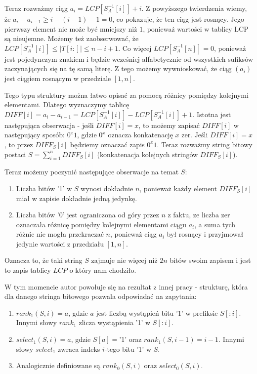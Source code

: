 \documentclass{article}
\begin{document}
Teraz rozważmy ciąg $a_i = LCP[S_A^{-1}[i]] + i$. Z powyższego twierdzenia wiemy, że $a_i - a_{i-1} \ge i - (i-1) - 1 = 0$, co pokazuje, że ten ciąg jest rosnący. Jego pierwszy element nie może być mniejszy niż $1$, ponieważ wartości w tablicy LCP są nieujemne. Możemy też zaobserwować, że $LCP[S_A^{-1}[i]] \le |T[i:]| \le n-i+1$. Co więcej $LCP[S_A^{-1}[n]] = 0$, ponieważ jest pojedynczym znakiem i będzie wcześniej alfabetycznie od wszystkich sufiksów zaczynających się na tę samą literę. Z tego możemy wywnioskować, że ciąg $(a_i)$ jest ciągiem rosnącym w przedziale $[1,n]$.

Tego typu struktury można łatwo opisać za pomocą różnicy pomiędzy kolejnymi elementami. Dlatego wyznaczymy tablicę $DIFF[i] = a_i - a_{i-1} = LCP[S_A^{-1}[i]] - LCP[S_A^{-1}[i]] + 1$. Istotna jest następująca obserwacja - jeśli $DIFF[i] = x$, to możemy zapisać $DIFF[i]$ w następujący sposób: $0^x1$, gdzie $0^x$ oznacza konkatenację $x$ zer. Jeśli $DIFF[i] = x$, to przez $DIFF_S[i]$ będziemy oznaczać zapis $0^x1$. Teraz rozważmy string bitowy postaci $S = \sum_{i=1}^n DIFF_S[i]$ (konkatenacja kolejnych stringów $DIFF_S[i]$).

Teraz możemy poczynić następujące obserwacje na temat $S$:
\begin{enumerate}
    \item Liczba bitów '1' w $S$ wynosi dokładnie $n$, ponieważ każdy element $DIFF_S[i]$ miał w zapisie dokładnie jedną jedynkę.
    \item Liczba bitów '0' jest ograniczona od góry przez $n$ z faktu, ze liczba zer oznaczała różnicę pomiędzy kolejnymi elementami ciągu $a_i$, a suma tych różnic nie mogła przekraczać $n$, ponieważ ciąg $a_i$ był rosnący i przyjmował jedynie wartości z przedziału $[1,n]$.
\end{enumerate}

Oznacza to, że taki string $S$ zajmuje nie więcej niż $2n$ bitów swoim zapisem i jest to zapis tablicy $LCP$ o który nam chodziło.

W tym momencie autor powołuje się na rezultat z innej pracy - strukturę, która dla danego stringa bitowego pozwala odpowiadać na zapytania:
\begin{enumerate}
    \item $rank_1(S, i) = a$, gdzie $a$ jest liczbą wystąpień bitu '1' w prefiksie $S[:i]$. Innymi słowy $rank_1$ zlicza wystąpienia '1' w $S[:i]$.
    \item $select_1(S, i) = a$, gdzie $S[a] = $'1' oraz $rank_1(S, i-1) = i-1$. Innymi słowy $select_1$ zwraca indeks $i$-tego bitu '1' w $S$.
    \item Analogicznie definiowane są $rank_0(S, i)$ oraz $select_0(S, i)$.
\end{enumerate}
\end{document}
